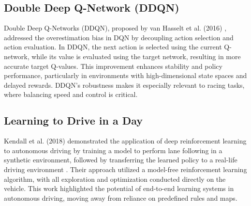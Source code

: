 \documentclass{article}
\begin{document}
\subsection{Double Deep Q-Network (DDQN)}
Double Deep Q-Networks (DDQN), proposed by van Hasselt et al. (2016) \cite{van2016deep}, addressed the overestimation bias in DQN by decoupling action selection and action evaluation. In DDQN, the next action is selected using the current Q-network, while its value is evaluated using the target network, resulting in more accurate target Q-values. This improvement enhances stability and policy performance, particularly in environments with high-dimensional state spaces and delayed rewards. DDQN’s robustness makes it especially relevant to racing tasks, where balancing speed and control is critical.

\subsection{Learning to Drive in a Day}
Kendall et al. (2018) demonstrated the application of deep reinforcement learning to autonomous driving by training a model to perform lane following in a synthetic environment, followed by transferring the learned policy to a real-life driving environment \cite{kendall2018drive}. Their approach utilized a model-free reinforcement learning algorithm, with all exploration and optimization conducted directly on the vehicle. This work highlighted the potential of end-to-end learning systems in autonomous driving, moving away from reliance on predefined rules and maps. 


\end{document}
